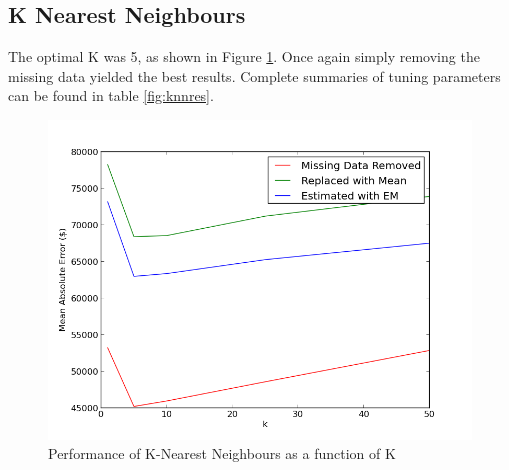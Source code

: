 \documentclass{acm_proc_article-sp}
\begin{document}
\subsection{K Nearest Neighbours}
	The optimal K was 5, as shown in Figure \ref{fig:knn}. Once again simply removing the missing data yielded the best results. Complete summaries of tuning parameters can be found in table \ref{fig:knnres}.
	
	\begin{figure}[!htbp]
   		\centering
  		\includegraphics[width=\linewidth]{knn_tuning.png}
    		\caption{Performance of K-Nearest Neighbours as a function of K}
    		\label{fig:knn}
	\end{figure}
\end{document}
